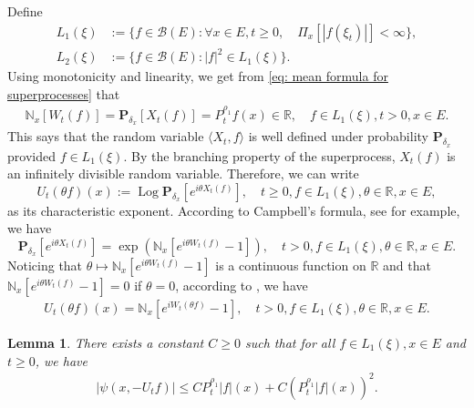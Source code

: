 \documentclass[12pt,a4paper]{amsart}
\theoremstyle{plain}
\newtheorem{lem}[thm]{Lemma}
\theoremstyle{definition}
\numberwithin{equation}{section}
\begin{document}
Define
\begin{align}
  L_1(\xi)
  &:= \{f\in \mathcal B(E): \forall x\in E, t\geq 0, \quad \Pi_x[|f(\xi_t)|]< \infty\}, \\
  L_2(\xi)
  &:= \{f \in \mathcal B(E): |f|^2 \in L_1(\xi)\}.
\end{align}
Using monotonicity and linearity, we get from \eqref{eq: mean formula for superprocesses}  that
\begin{align}
  \mathbb N_x[W_t(f)]
  = \mathbf P_{\delta_x}[X_t(f)]
  = P^{\rho_1}_t f(x) \in \mathbb R,
  \quad f\in L_1(\xi), t > 0,x\in E.
\end{align}
This says that the random variable $\langle X_t, f\rangle$ is well defined under probability $\mathbf P_{\delta_x}$ provided $f\in L_1(\xi)$.
By the branching property of the superprocess, $X_t(f)$ is an infinitely divisible random variable.
Therefore, we can write
\[
  U_t(\theta f)(x)
  := \operatorname{Log} \mathbf P_{\delta_x}[e^{i \theta X_t( f)}],
  \quad t\geq 0, f\in L_1(\xi), \theta \in \mathbb R, x\in E,
\]
as its characteristic exponent.
According to Campbell's formula, see \cite[Theorem 2.7]{Kyprianou2014Fluctuations} for example, we have
\[
  \mathbf P_{\delta_x} [e^{i\theta X_t(f)}]
  = \exp(\mathbb N_x[ e^{i\theta W_t(f)} - 1]),
  \quad t>0, f\in L_1(\xi), \theta \in \mathbb R, x\in E.
\]
Noticing that $\theta \mapsto \mathbb N_x[e^{i\theta W_t(f)} - 1]$ is a continuous function on $\mathbb R$ and that $\mathbb N_x[e^{i\theta W_t(f)} - 1] = 0$ if $\theta = 0$, according to \cite[Lemma 7.6]{Sato2013Levy}, we have
\begin{align}
  \label{eq: N and characteristic exponent}
  U_t(\theta f)(x)
  = \mathbb N_x[e^{i W_t(\theta f)} - 1],
  \quad t>0, f\in L_1(\xi), \theta \in \mathbb R, x\in E.
\end{align}

\begin{lem}
  There exists a constant $C\geq 0$ such that
  for all $f \in L_1(\xi),x\in E$ and $t\geq 0$, we have
  \begin{align}
    \label{eq: upper bound of psi(v)}
    |\psi (x,-U_tf)|
    \leq C P^{\rho_1}_t |f|(x) + C (P^{\rho_1}_t |f| (x))^2.
  \end{align}
\end{lem}
\end{document}

